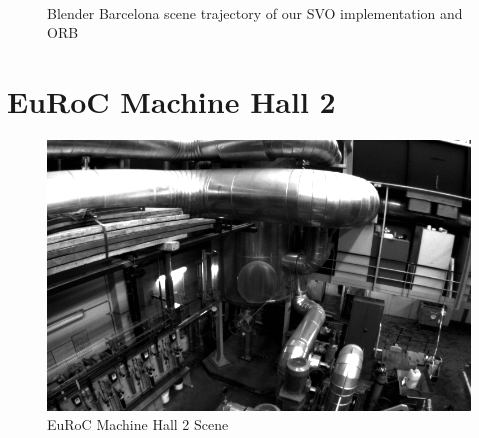 \documentclass[11pt,a4paper,titlepage,oneside]{report}
\begin{document}
\begin{figure}[H]
  \centering
  \\
  \caption{Blender Barcelona scene trajectory of our SVO implementation and ORB}\label{fig:blender_barcelona_comp}
\end{figure}

\section{EuRoC Machine Hall 2}

\begin{figure}[H]
  \includegraphics[width=1.0\textwidth]{img/euroc_scene.png}
  \caption{EuRoC Machine Hall 2 Scene}\label{fig:euroc_scene}
\end{figure}
\end{document}
